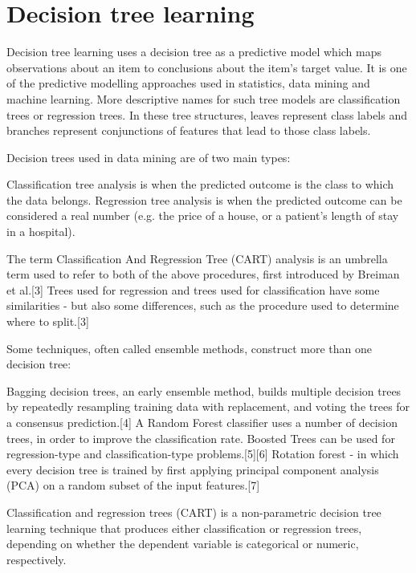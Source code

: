 \documentclass[caret-main.tex]{subfiles}
\begin{document}
\section{Decision tree learning}




Decision tree learning uses a decision tree as a predictive model which maps observations about an item to conclusions about the item's target value. It is one of the predictive modelling approaches used in statistics, data mining and machine learning. More descriptive names for such tree models are classification trees or regression trees. In these tree structures, leaves represent class labels 
and branches represent conjunctions of features that lead to those class labels.


Decision trees used in data mining are of two main types:

Classification tree analysis is when the predicted outcome is the class to which the data belongs.
Regression tree analysis is when the predicted outcome can be considered a real number (e.g. the price of a house, or a patient’s length of stay in a hospital).


The term Classification And Regression Tree (CART) analysis is an umbrella term used to refer to both of the above procedures, first introduced by Breiman et al.[3] Trees used for regression and trees used for classification have some similarities - but also some differences, such as the procedure used to determine where to split.[3]

Some techniques, often called ensemble methods, construct more than one decision tree:

Bagging decision trees, an early ensemble method, builds multiple decision trees by repeatedly resampling training data with replacement, and voting the trees for a consensus prediction.[4]
A Random Forest classifier uses a number of decision trees, in order to improve the classification rate.
Boosted Trees can be used for regression-type and classification-type problems.[5][6]
Rotation forest - in which every decision tree is trained by first applying principal component analysis (PCA) on a random subset of the input features.[7]

\newpage
Classification and regression trees (CART) is a non-parametric decision tree learning technique that produces either classification or regression trees, depending on whether the dependent variable is categorical or numeric, respectively.
\end{document}
